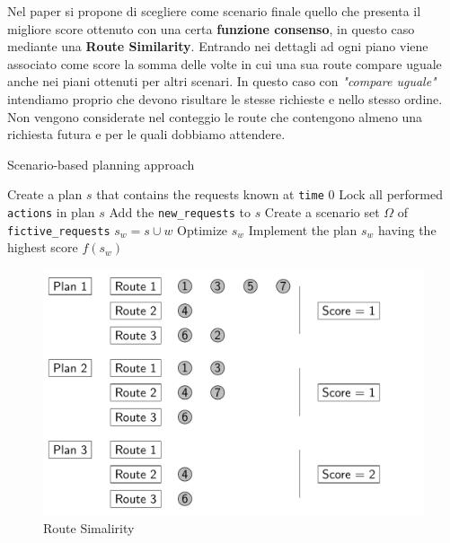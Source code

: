 \documentclass[
    article,            %
    12pt,                %
    oneside,            %
    a4paper,            %
    english,            %
    italian,                %
    sumario=tradicional,
]{abntex2}
\begin{document}
Nel paper \cite{SBPPDVR} si propone di scegliere come scenario finale quello che presenta il migliore score ottenuto con una certa \textbf{funzione consenso}, in questo caso mediante una \textbf{Route Similarity}. \newline Entrando nei dettagli ad ogni piano viene associato come score la somma delle volte in cui una sua route compare uguale anche nei piani ottenuti per altri scenari. In questo caso con \textit{"compare uguale"} intendiamo proprio che devono risultare le stesse richieste e nello stesso ordine. Non vengono considerate nel conteggio le route che contengono almeno una richiesta futura e per le quali dobbiamo attendere.

\begin{algorithm}
    \caption{Scenario-based planning approach}
    \begin{algorithmic}
    \label{alg:SBPA}
        \State Create a plan $s$ that contains the requests known at \texttt{time} $0$
            \State Lock all performed \texttt{actions} in plan $s$
            \State Add the \texttt{new\_requests} to $s$
            \State Create a scenario set $\Omega$ of \texttt{fictive\_requests}
                \State $s_w = s \cup w$
                \State Optimize $s_w$
            \EndFor
            \State Implement the plan $s_w$ having the highest score $f(s_w)$
        \EndWhile
    \end{algorithmic}
\end{algorithm}

\begin{figure}
    \centering
    \includegraphics[scale=0.30]{Images/RouteSimilarity.png}
    \caption{Route Simalirity}
    \label{fig:RouteSimilarity}
\end{figure}
\end{document}
